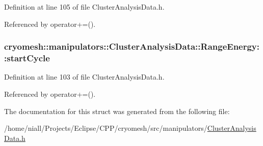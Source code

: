 \-Definition at line 105 of file \-Cluster\-Analysis\-Data.\-h.



\-Referenced by operator+=().

\hypertarget{structcryomesh_1_1manipulators_1_1ClusterAnalysisData_1_1RangeEnergy_a4160dfffe32413f76e5effce2c95ae20}{
\subsubsection[{start\-Cycle}]{ {\bf cryomesh\-::manipulators\-::\-Cluster\-Analysis\-Data\-::\-Range\-Energy\-::start\-Cycle}}}\label{structcryomesh_1_1manipulators_1_1ClusterAnalysisData_1_1RangeEnergy_a4160dfffe32413f76e5effce2c95ae20}


\-Definition at line 103 of file \-Cluster\-Analysis\-Data.\-h.



\-Referenced by operator+=().



\-The documentation for this struct was generated from the following file\-:\begin{DoxyCompactItemize}
\item 
/home/niall/\-Projects/\-Eclipse/\-C\-P\-P/cryomesh/src/manipulators/\hyperlink{ClusterAnalysisData_8h}{\-Cluster\-Analysis\-Data.\-h}\end{DoxyCompactItemize}
